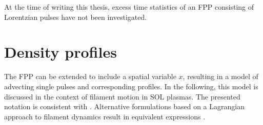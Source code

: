 At the time of writing this thesis, excess time statistics of an FPP consisting of Lorentzian pulses have not been investigated.

\section{Density profiles}\label{n_prof}
The FPP can be extended to include a spatial variable $x$, resulting in a model of advecting single pulses and corresponding profiles. In the following, this model is discussed in the context of filament motion in SOL plasmas. The presented notation is consistent with \cite{garcia2016stochastic}. Alternative formulations based on a Lagrangian approach to filament dynamics result in equivalent expressions \cite{militello2016scrape,militello2016relation,walkden2017interpretation,militello2018two}.

